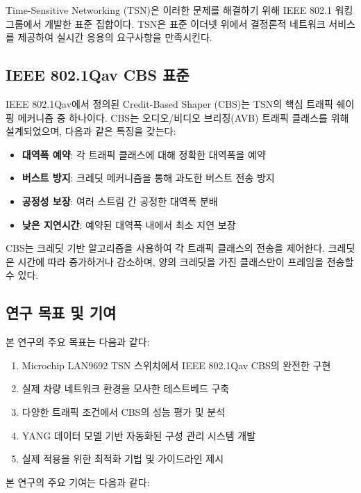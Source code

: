 \documentclass[twocolumn,10pt]{article}
\begin{document}
Time-Sensitive Networking (TSN)은 이러한 문제를 해결하기 위해 IEEE 802.1 워킹 그룹에서 개발한 표준 집합이다. TSN은 표준 이더넷 위에서 결정론적 네트워크 서비스를 제공하여 실시간 응용의 요구사항을 만족시킨다\cite{finn2018introduction}.

\subsection{IEEE 802.1Qav CBS 표준}

IEEE 802.1Qav에서 정의된 Credit-Based Shaper (CBS)는 TSN의 핵심 트래픽 쉐이핑 메커니즘 중 하나이다. CBS는 오디오/비디오 브리징(AVB) 트래픽 클래스를 위해 설계되었으며, 다음과 같은 특징을 갖는다:

\begin{itemize}
    \item \textbf{대역폭 예약}: 각 트래픽 클래스에 대해 정확한 대역폭을 예약
    \item \textbf{버스트 방지}: 크레딧 메커니즘을 통해 과도한 버스트 전송 방지
    \item \textbf{공정성 보장}: 여러 스트림 간 공정한 대역폭 분배
    \item \textbf{낮은 지연시간}: 예약된 대역폭 내에서 최소 지연 보장
\end{itemize}

CBS는 크레딧 기반 알고리즘을 사용하여 각 트래픽 클래스의 전송을 제어한다. 크레딧은 시간에 따라 증가하거나 감소하며, 양의 크레딧을 가진 클래스만이 프레임을 전송할 수 있다.

\subsection{연구 목표 및 기여}

본 연구의 주요 목표는 다음과 같다:

\begin{enumerate}
    \item Microchip LAN9692 TSN 스위치에서 IEEE 802.1Qav CBS의 완전한 구현
    \item 실제 차량 네트워크 환경을 모사한 테스트베드 구축
    \item 다양한 트래픽 조건에서 CBS의 성능 평가 및 분석
    \item YANG 데이터 모델 기반 자동화된 구성 관리 시스템 개발
    \item 실제 적용을 위한 최적화 기법 및 가이드라인 제시
\end{enumerate}

본 연구의 주요 기여는 다음과 같다:
\end{document}
